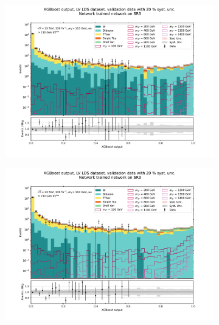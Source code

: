 \documentclass[12pt, a4paper]{book}
\begin{document}
\begin{figure}[!ht]
	\centering
	\begin{subfigure}[b]{0.49\textwidth}
      \centering
      \includegraphics[width=1\textwidth]{XGBoost/Model_independent/150/LV_LDS/VAL_ee.pdf}
   \end{subfigure}
   \hfill
   \begin{subfigure}[b]{0.49\textwidth}
      \centering
      \includegraphics[width=1\textwidth]{XGBoost/Model_independent/150/LV_LDS/VAL_uu.pdf}
   \end{subfigure}
   \hfill
   \begin{subfigure}[b]{0.49\textwidth}
      \centering

\end{subfigure}
\end{figure}
\end{document}
